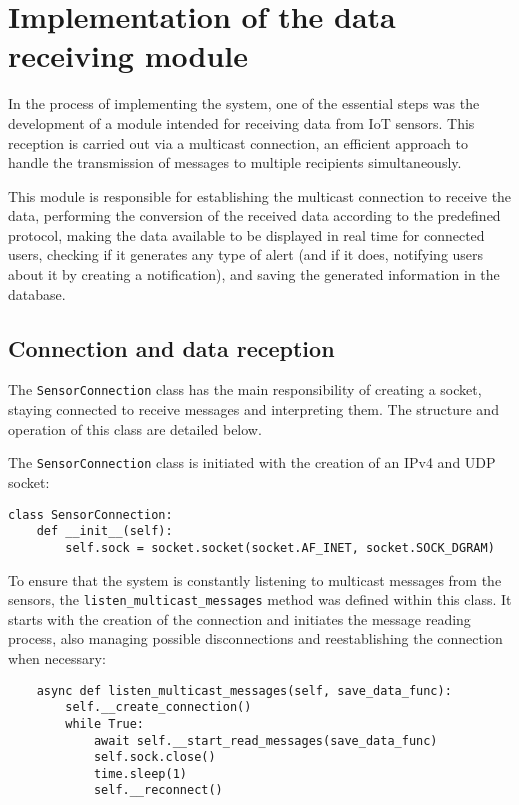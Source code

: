 \section{Implementation of the data receiving module}\label{sec:Implementation of the data receiving module}

In the process of implementing the system, one of the essential steps was the development of a module intended for receiving data from IoT sensors. This reception is carried out via a multicast connection, an efficient approach to handle the transmission of messages to multiple recipients simultaneously.

This module is responsible for establishing the multicast connection to receive the data, performing the conversion of the received data according to the predefined protocol, making the data available to be displayed in real time for connected users, checking if it generates any type of alert (and if it does, notifying users about it by creating a notification), and saving the generated information in the database.

\subsection[Connection and data reception]{Connection and data reception}\label{subsec:Connection and data reception}

The \texttt{SensorConnection} class has the main responsibility of creating a socket, staying connected to receive messages and interpreting them. The structure and operation of this class are detailed below.

The \texttt{SensorConnection} class is initiated with the creation of an IPv4 and UDP socket:

\begin{verbatim}
class SensorConnection:
    def __init__(self):
        self.sock = socket.socket(socket.AF_INET, socket.SOCK_DGRAM)
\end{verbatim}

To ensure that the system is constantly listening to multicast messages from the sensors, the \texttt{listen\_multicast\_messages} method was defined within this class. It starts with the creation of the connection and initiates the message reading process, also managing possible disconnections and reestablishing the connection when necessary:

\begin{verbatim}
    async def listen_multicast_messages(self, save_data_func):
        self.__create_connection()
        while True:
            await self.__start_read_messages(save_data_func)
            self.sock.close()
            time.sleep(1)
            self.__reconnect()
\end{verbatim}

